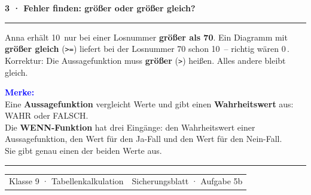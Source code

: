 \documentclass[11pt,a4paper]{article}
\newcommand{\sectiontitle}[2]{%
  \vspace{4mm}
  {\color{#1}\bfseries\large #2}\par
  \vspace{1.2mm}
  {\color{#1}\rule{\linewidth}{0.7pt}}\par
  \vspace{2mm}
}
\begin{document}
\sectiontitle{Blue}{3 · Fehler finden: größer oder größer gleich?}

{\small\linespread{1.15}\selectfont
Anna erhält 10\,\texteuro{} nur bei einer Losnummer \textbf{größer als 70}.
Ein Diagramm mit \textbf{größer gleich} (\texttt{>=}) liefert bei der
Losnummer 70 schon 10\,\texteuro{} – richtig wären 0\,\texteuro.
Korrektur: Die Aussagefunktion muss \textbf{größer} (\texttt{>}) heißen.
Alles andere bleibt gleich.\par}

\vspace{4mm}
\colorbox{Mint}{%
  \parbox{\dimexpr\linewidth-2\fboxsep\relax}{%
    \vspace{2mm}
    \textcolor{Blue}{\bfseries Merke:}\\[1.5mm]
    Eine \textbf{Aussagefunktion} vergleicht Werte und gibt einen
    \textbf{Wahrheitswert} aus: WAHR oder FALSCH.\\[1.5mm]
    Die \textbf{WENN-Funktion} hat drei Eingänge: den Wahrheitswert einer
    Aussagefunktion, den Wert für den Ja-Fall und den Wert für den
    Nein-Fall.\\[1.5mm]
    Sie gibt genau einen der beiden Werte aus.
    \vspace{2mm}
  }%
}

\vfill
{\color{Line}\rule{\linewidth}{0.5pt}}\par
\vspace{1.5mm}
\begin{tabularx}{\linewidth}{@{}Xr@{}}
  {\small\color{Muted}Klasse 9 · Tabellenkalkulation} &
  {\small\color{Muted}Sicherungsblatt · Aufgabe 5b}
\end{tabularx}
\end{document}
